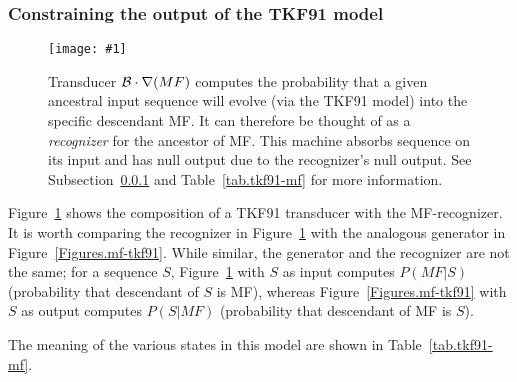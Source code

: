 \documentclass{article}
\newcommand{\secref}[1]{Subsection~\ref{sec.#1}}
\newcommand{\seclabel}[1]{\label{sec.#1}}
\newcommand{\tabnum}[1]{\ref{tab.#1}}
\newcommand{\tabref}[1]{Table~\tabnum{#1}}
\newcommand{\figref}[1]{Figure~\ref{Figures.#1}}
\newcommand{\figlabel}[1]{\label{Figures.#1}}
\newcommand{\easyfig}[4]{
\begin{figure}
\texttt{[image: \#1]}
\caption{ \figlabel{#3} #4}
\end{figure}}
\newcommand{\tallpdffig}[2]{\easyfig{#1-fig.pdf}{height=.8\textheight}{#1}{#2}}
\newcommand\tkf{{\cal B}}
\newcommand\recognize{\nabla}
\begin{document}


\subsubsection{Constraining the output of the TKF91 model}
\seclabel{tkf91-mf}

\tallpdffig{tkf91-mf}{Transducer $\tkf \cdot \recognize(MF)$
computes the probability that a given ancestral input sequence will evolve (via the TKF91 model) into the specific descendant MF.  
It can therefore be thought of as a {\em recognizer} for the ancestor of MF.
This machine absorbs sequence on its input and has null output due to 
the recognizer's null output.
See \secref{tkf91-mf} and \tabref{tkf91-mf} for more information.
}

\figref{tkf91-mf} shows the composition of a TKF91 transducer with the MF-recognizer.  
It is worth comparing the recognizer in \figref{tkf91-mf}
with the analogous generator in \figref{mf-tkf91}. 
While similar, the generator and the recognizer are not the same;
for a sequence $S$,
\figref{tkf91-mf} with $S$ as input computes $P(MF|S)$
(probability that descendant of $S$ is MF), 
whereas \figref{mf-tkf91} with $S$ as output computes $P(S|MF)$
(probability that descendant of MF is $S$).

The meaning of the various states in this model are shown in \tabref{tkf91-mf}.
\end{document}
